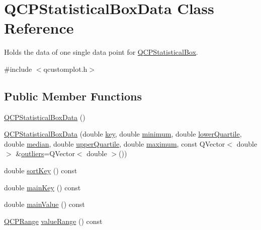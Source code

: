 \hypertarget{class_q_c_p_statistical_box_data}{}\section{Q\+C\+P\+Statistical\+Box\+Data Class Reference}
\label{class_q_c_p_statistical_box_data}


Holds the data of one single data point for \hyperlink{class_q_c_p_statistical_box}{Q\+C\+P\+Statistical\+Box}.  




{\ttfamily \#include $<$qcustomplot.\+h$>$}

\subsection*{Public Member Functions}
\begin{DoxyCompactItemize}
\item 
\hyperlink{class_q_c_p_statistical_box_data_ab96c4b93670a8dcac8a3d4080fd722ee}{Q\+C\+P\+Statistical\+Box\+Data} ()
\item 
\hyperlink{class_q_c_p_statistical_box_data_a66b0c6d39765d0feb49c286fba4e4ef5}{Q\+C\+P\+Statistical\+Box\+Data} (double \hyperlink{class_q_c_p_statistical_box_data_a2d0b5ca5130e8a73294c46b8b2fd77b8}{key}, double \hyperlink{class_q_c_p_statistical_box_data_adc2f4b8cbff9f2e4a676f32bad8a7e3a}{minimum}, double \hyperlink{class_q_c_p_statistical_box_data_af9f478b4ea0789fa6cff7eebb654b5d4}{lower\+Quartile}, double \hyperlink{class_q_c_p_statistical_box_data_a116cd53ae6685979ec3b051cfc7dbba5}{median}, double \hyperlink{class_q_c_p_statistical_box_data_a5604dfe04b103e5ac73ce7895b46303b}{upper\+Quartile}, double \hyperlink{class_q_c_p_statistical_box_data_aa2800abda337decfc4277cb8bf846d6f}{maximum}, const Q\+Vector$<$ double $>$ \&\hyperlink{class_q_c_p_statistical_box_data_abaa27539fbd941d3f1eb8169e881e308}{outliers}=Q\+Vector$<$ double $>$())
\item 
double \hyperlink{class_q_c_p_statistical_box_data_a168100275e85935207deec86216abc88}{sort\+Key} () const
\item 
double \hyperlink{class_q_c_p_statistical_box_data_a4bbbf44f60ac5eca73c5f4135741562e}{main\+Key} () const
\item 
double \hyperlink{class_q_c_p_statistical_box_data_a0df3cb31cfd6d48decf6173297b81746}{main\+Value} () const
\item 
\hyperlink{class_q_c_p_range}{Q\+C\+P\+Range} \hyperlink{class_q_c_p_statistical_box_data_a1a2410fcf3d45fa3a1ad09e265b9bcad}{value\+Range} () const
\end{DoxyCompactItemize}
